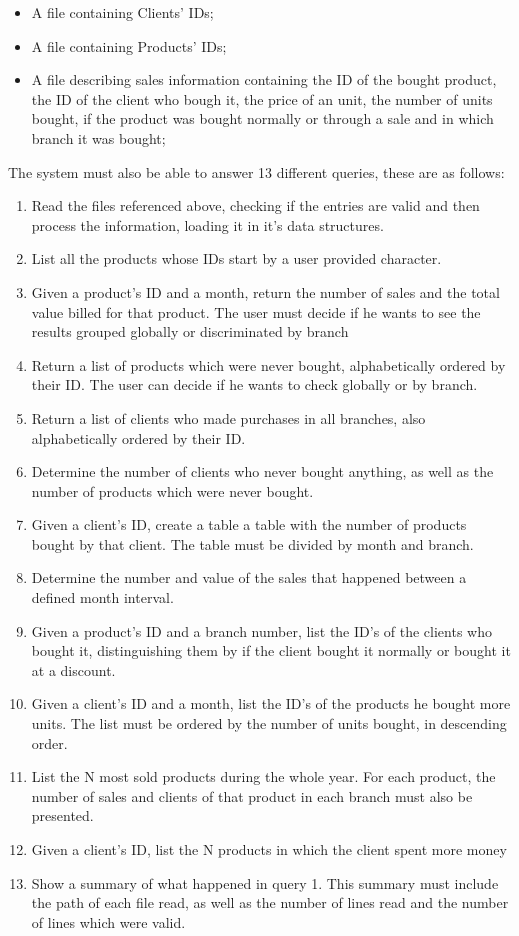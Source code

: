 \documentclass[a4paper]{report}
\begin{document}
\begin{itemize}
    \item A file containing Clients' IDs;
    \item A file containing Products' IDs;
    \item A file describing sales information containing the ID of the bought product, the ID of the client who bough it, the price of an unit, the number of units bought, if the product was bought normally or through a sale and in which branch it was bought;
\end{itemize}
The system must also be able to answer 13 different queries, these are as follows:
\begin{enumerate}
    \item Read the files referenced above, checking if the entries are valid and then process the information, loading it in it's data structures.
    \item List all the products whose IDs start by a user provided character.
	\item Given a product's ID and a month, return the number of sales and the total value billed for that product. The user must decide if he wants to see the results grouped globally or discriminated by branch
    \item Return a list of products which were never bought, alphabetically ordered  by their ID. The user can decide if he wants to check globally or by branch. 
    \item Return a list of clients who made purchases in all branches, also alphabetically ordered  by their ID.
    \item Determine the number of clients who never bought anything, as well as the number of products which were never bought.
    \item Given a client's ID, create a table a table with the number of products bought by that client. The table must be divided by month and branch.
    \item Determine the number and value of the sales that happened between a defined month interval.
    \item Given a product's ID and a branch number, list the ID's of the clients who bought it, distinguishing them by if the client  bought it normally or bought it at a discount.
    \item Given a client's ID and a month, list the ID's of the products he bought more units. The list must be ordered  by the number of units bought, in descending order.
    \item List the N most sold products during the whole year. For each product, the number of sales and clients of that product in each branch must also be presented.
    \item Given a client's ID, list the N products in which the client spent more money
    \item Show a summary of what happened in query 1. This summary must include the path of each file read, as well as the number of lines read and the number of lines which were valid.
\end{enumerate}
\end{document}
